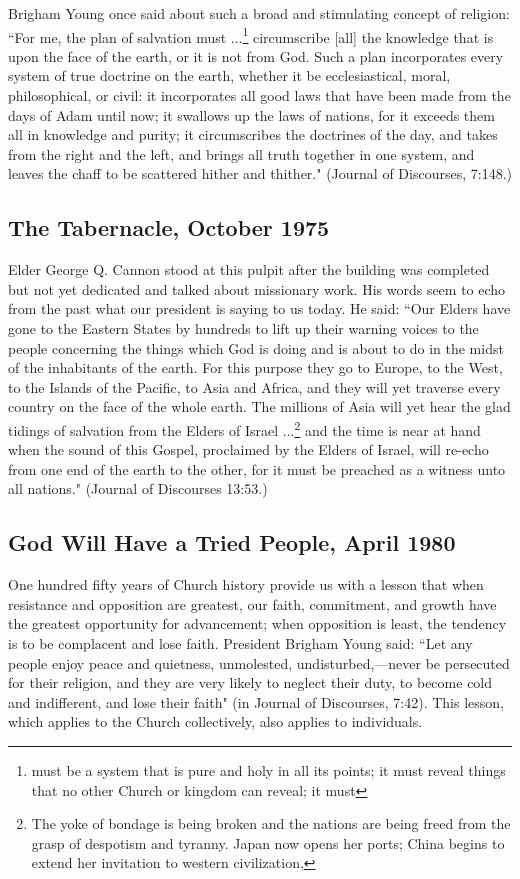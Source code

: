 Brigham Young once said about such a broad and stimulating concept of religion: ``For me, the plan of salvation must ...\footnote{must be a system that is pure and holy in all its points; it must reveal things that no other Church or kingdom can reveal; it must} circumscribe [all] the knowledge that is upon the face of the earth, or it is not from God. Such a plan incorporates every system of true doctrine on the earth, whether it be ecclesiastical, moral, philosophical, or civil: it incorporates all good laws that have been made from the days of Adam until now; it swallows up the laws of nations, for it exceeds them all in knowledge and purity; it circumscribes the doctrines of the day, and takes from the right and the left, and brings all truth together in one system, and leaves the chaff to be scattered hither and thither." (Journal of Discourses, 7:148.)

\subsection{The Tabernacle, October 1975}

Elder George Q. Cannon stood at this pulpit after the building was completed but not yet dedicated and talked about missionary work. His words seem to echo from the past what our president is saying to us today. He said: ``Our Elders have gone to the Eastern States by hundreds to lift up their warning voices to the people concerning the things which God is doing and is about to do in the midst of the inhabitants of the earth. For this purpose they go to Europe, to the West, to the Islands of the Pacific, to Asia and Africa, and they will yet traverse every country on the face of the whole earth. The millions of Asia will yet hear the glad tidings of salvation from the Elders of Israel ...\footnote{The yoke of bondage is being broken and the nations are being freed from the grasp of despotism and tyranny. Japan now opens her ports; China begins to extend her invitation to western civilization,} and the time is near at hand when the sound of this Gospel, proclaimed by the Elders of Israel, will re-echo from one end of the earth to the other, for it must be preached as a witness unto all nations." (Journal of Discourses 13:53.)

\subsection{God Will Have a Tried People, April 1980}

One hundred fifty years of Church history provide us with a lesson that when resistance and opposition are greatest, our faith, commitment, and growth have the greatest opportunity for advancement; when opposition is least, the tendency is to be complacent and lose faith. President Brigham Young said: ``Let any people enjoy peace and quietness, unmolested, undisturbed,—never be persecuted for their religion, and they are very likely to neglect their duty, to become cold and indifferent, and lose their faith" (in Journal of Discourses, 7:42). This lesson, which applies to the Church collectively, also applies to individuals.